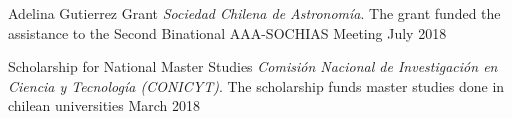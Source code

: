 

\begin{cvhonors}
	\cvhonor
	{Adelina Gutierrez Grant} %
	{\textit{Sociedad Chilena de Astronom\'ia}. The grant funded the assistance to the Second Binational AAA-SOCHIAS Meeting} %
	{} %
	{July 2018} %
	
	\cvhonor
	{Scholarship for National Master Studies} %
	{\textit{Comisi\'on Nacional de Investigaci\'on en Ciencia y Tecnolog\'ia (CONICYT)}. The scholarship funds master studies done in chilean universities} %
	{} %
	{March 2018} %
	
\end{cvhonors}